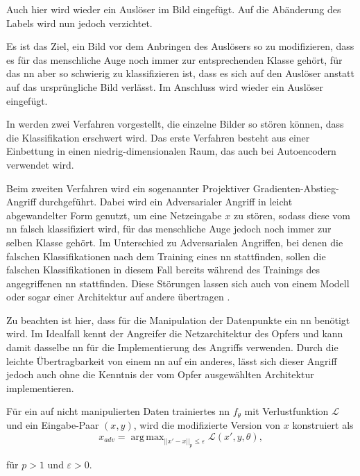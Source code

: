 \documentclass[twoside, 12pt,a4paper]{book}
\DeclareMathOperator*{\argmax}{arg\,max}
\numberwithin{equation}{section}
\begin{document}
	\noindent Auch hier wird wieder ein Auslöser im Bild eingefügt. Auf die Abänderung des Labels wird nun jedoch verzichtet.
	
	\noindent Es ist das Ziel, ein Bild vor dem Anbringen des Auslösers so zu modifizieren, dass es für das menschliche Auge noch immer zur entsprechenden Klasse gehört, für das \ac{nn} aber so schwierig zu klassifizieren ist, dass es sich auf den Auslöser anstatt auf das ursprüngliche Bild verlässt. Im Anschluss wird wieder ein Auslöser eingefügt.
	
	\noindent In \cite{labelconsistent} werden zwei Verfahren vorgestellt, die einzelne Bilder so stören können, dass die Klassifikation erschwert wird. Das erste Verfahren besteht aus einer Einbettung in einen niedrig-dimensionalen Raum, das auch bei Autoencodern \cite{autoencoders} verwendet wird.
	
	\noindent Beim zweiten Verfahren wird ein sogenannter Projektiver Gradienten-Abstieg-Angriff durchgeführt. Dabei wird ein Adversarialer Angriff in leicht abgewandelter Form genutzt, um eine Netzeingabe $x$ zu stören, sodass diese vom \ac{nn} falsch klassifiziert wird, für das menschliche Auge jedoch noch immer zur selben Klasse gehört. Im Unterschied zu Adversarialen Angriffen, bei denen die falschen Klassifikationen nach dem Training eines \ac{nn} stattfinden, sollen die falschen Klassifikationen in diesem Fall bereits während des Trainings des angegriffenen \ac{nn} stattfinden. Diese Störungen lassen sich auch von einem Modell oder sogar einer Architektur auf andere übertragen \cite{szegedy2013intriguing, papernot2016transferability}.
	
	\noindent Zu beachten ist hier, dass für die Manipulation der Datenpunkte ein \ac{nn} benötigt wird. Im Idealfall kennt der Angreifer die Netzarchitektur des Opfers und kann damit dasselbe \ac{nn} für die Implementierung des Angriffs verwenden. Durch die leichte Übertragbarkeit von einem \ac{nn} auf ein anderes, lässt sich dieser Angriff jedoch auch ohne die Kenntnis der vom Opfer ausgewählten Architektur implementieren.

	\noindent Für ein auf nicht manipulierten Daten trainiertes \ac{nn} $f_\theta$ mit Verlustfunktion $\mathcal{L}$ und ein Eingabe-Paar $(x,y)$, wird die modifizierte Version von $x$ konstruiert als
	\begin{equation}
	x_{adv} = \argmax_{||x'-x||_p \leq \varepsilon}{\mathcal{L}(x',y,\theta)},
	\end{equation}
	
	\noindent für $p >1 $ und $\varepsilon > 0$. \\
	
\end{document}
